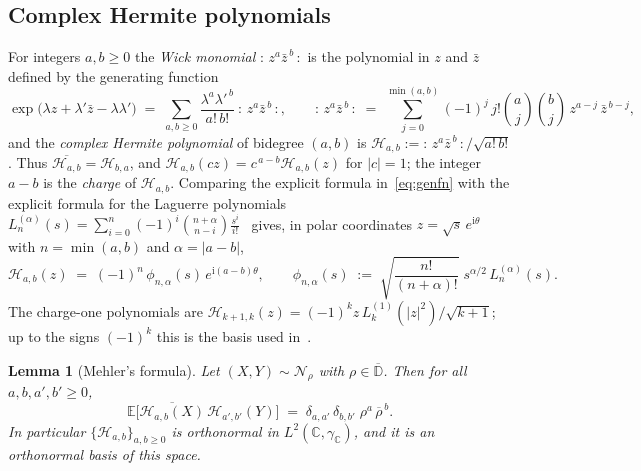 \documentclass[11pt,reqno]{amsart}
\newtheorem{lemma}[theorem]{Lemma}
\theoremstyle{definition}
\numberwithin{equation}{section}
\newcommand{\C}{\mathbb{C}}
\newcommand{\D}{\mathbb{D}}
\newcommand{\E}{\mathbb{E}}
\newcommand{\ii}{\mathrm{i}}
\newcommand{\gC}{\gamma_{\C}}
\newcommand{\wick}[1]{{:}\,#1\,{:}}
\begin{document}
\subsection{Complex Hermite polynomials}\label{sec:hermite}
For integers $a,b\ge0$ the \emph{Wick monomial} $\wick{z^a\bar z^{\,b}}$ is the polynomial in $z$ and $\bar z$ defined by the generating function
\begin{equation}\label{eq:genfn}
  \exp\bigl(\lambda z+\lambda'\bar z-\lambda\lambda'\bigr) \;=\; \sum_{a,b\ge0}\frac{\lambda^a\lambda'^{\,b}}{a!\,b!}\ \wick{z^a\bar z^{\,b}},
  \qquad
  \wick{z^a\bar z^{\,b}} \;=\; \sum_{j=0}^{\min(a,b)} (-1)^j\, j! \binom{a}{j}\binom{b}{j}\, z^{a-j}\,\bar z^{\,b-j},
\end{equation}
and the \emph{complex Hermite polynomial} of bidegree $(a,b)$ is $\mathcal{H}_{a,b}:=\wick{z^a\bar z^{\,b}}/\sqrt{a!\,b!}$. Thus $\overline{\mathcal{H}_{a,b}}=\mathcal{H}_{b,a}$, and $\mathcal{H}_{a,b}(cz)=c^{\,a-b}\mathcal{H}_{a,b}(z)$ for $|c|=1$; the integer $a-b$ is the \emph{charge} of $\mathcal{H}_{a,b}$. Comparing the explicit formula in~\eqref{eq:genfn} with the explicit formula for the Laguerre polynomials $L_n^{(\alpha)}(s)=\sum_{i=0}^n(-1)^i\binom{n+\alpha}{n-i}\frac{s^i}{i!}$~\cite[Section~5.1]{Sze75} gives, in polar coordinates $z=\sqrt{s}\,e^{\ii\theta}$ with $n=\min(a,b)$ and $\alpha=|a-b|$,
\begin{equation}\label{eq:hermite-polar}
  \mathcal{H}_{a,b}(z) \;=\; (-1)^n\, \phi_{n,\alpha}(s)\, e^{\ii(a-b)\theta},
  \qquad
  \phi_{n,\alpha}(s) \;:=\; \sqrt{\frac{n!}{(n+\alpha)!}}\; s^{\alpha/2}\, L_n^{(\alpha)}(s).
\end{equation}
The charge-one polynomials are $\mathcal{H}_{k+1,k}(z) = (-1)^k z\,L_k^{(1)}(|z|^2)/\sqrt{k+1}$; up to the signs $(-1)^k$ this is the basis used in~\cite{HJM26}.

\begin{lemma}[Mehler's formula]\label{lem:mehler}
Let $(X,Y)\sim\mathcal{N}_\rho$ with $\rho\in\overline{\D}$. Then for all $a,b,a',b'\ge0$,
\begin{equation}\label{eq:mehler}
  \E\big[\overline{\mathcal{H}_{a,b}(X)}\,\mathcal{H}_{a',b'}(Y)\big] \;=\; \delta_{a,a'}\,\delta_{b,b'}\;\rho^{a}\,\overline{\rho}^{\,b}.
\end{equation}
In particular $\{\mathcal{H}_{a,b}\}_{a,b\ge0}$ is orthonormal in $L^2(\C,\gC)$, and it is an orthonormal basis of this space.
\end{lemma}
\end{document}
